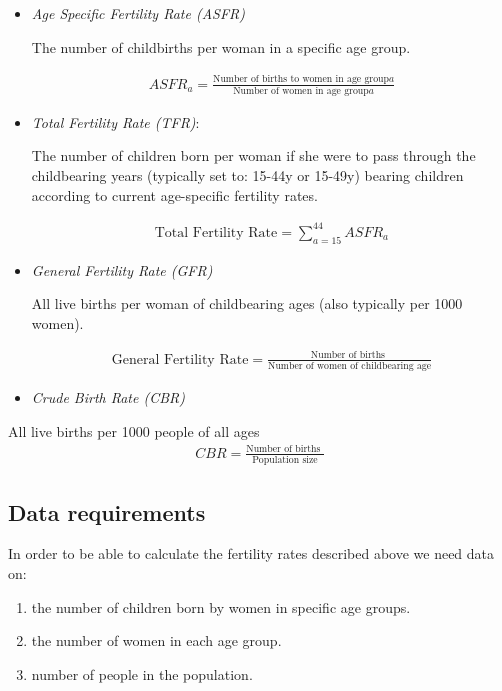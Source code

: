 \documentclass[
]{book}
\providecommand{\tightlist}{%
  \setlength{\itemsep}{0pt}\setlength{\parskip}{0pt}}
\begin{document}
\begin{itemize}
\item
  \emph{Age Specific Fertility Rate (ASFR)}

  The number of childbirths per woman in a specific age group.

  \begin{align}
        ASFR_a=\frac{\text{Number of births to women in age group} a}{\text{Number of  women in age     group} a}
    \end{align}
\item
  \emph{Total Fertility Rate (TFR)}:

  The number of children born per woman if she were to pass through the childbearing years (typically set to: 15-44y or 15-49y) bearing children according to current age-specific fertility rates.

  \begin{align}
    \text{Total Fertility Rate}=\sum_{a=15}^{44}ASFR_a
  \end{align}
\item
  \emph{General Fertility Rate (GFR)}

  All live births per woman of childbearing ages (also typically per 1000 women).

  \begin{align}
    \text{General Fertility Rate}=\frac{\text{Number of births }}{\text{Number of  women of childbearing age} }
  \end{align}
\item
  \emph{Crude Birth Rate (CBR)}
\end{itemize}

All live births per 1000 people of all ages
\begin{align}
    CBR=\frac{\text{Number of births }}{\text{Population size} }
  \end{align}

\hypertarget{data-requirements}{%
\subsection{Data requirements}\label{data-requirements}}

In order to be able to calculate the fertility rates described above we need data on:

\begin{enumerate}
\def\labelenumi{\arabic{enumi}.}
\tightlist
\item
  the number of children born by women in specific age groups.
\item
  the number of women in each age group.
\item
  number of people in the population.
\end{enumerate}
\end{document}
